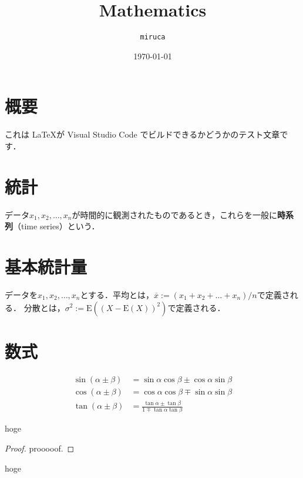 \documentclass[dvipdfmx,uplatex]{jsarticle}
\begin{document}
\title{Mathematics}
\author{\texttt{miruca}}
\date{\today}
\maketitle

\section{概要}
これは \LaTeX が Visual Studio Code でビルドできるかどうかのテスト文章です．

\section{統計}
データ$x_1,x_2,\dots,x_n$が時間的に観測されたものであるとき，これらを一般に\textbf{時系列}（time series）という．

\section{基本統計量}
データを$x_1,x_2,\dots,x_n$とする．平均とは，$\overline{x}:=(x_1 + x_2 + \dots + x_n)/n$で定義される．
分散とは，$\sigma^2:=\mathrm{E}\left( \left( X - \mathrm{E}(X) \right)^2 \right)$で定義される．

\section{数式}
\begin{align}
    \sin(\alpha \pm \beta) &= \sin \alpha \cos \beta \pm \cos \alpha \sin \beta \\
    \cos(\alpha \pm \beta) &= \cos \alpha \cos \beta \mp \sin \alpha \sin \beta \\
    \tan(\alpha \pm \beta) &= \frac{\tan \alpha \pm \tan \beta}{1 \mp \tan \alpha \tan \beta}
\end{align}

\begin{defbox}
    \begin{definition}
      hoge
    \end{definition}
\end{defbox}

\begin{proof}
    prooooof.  
\end{proof}
%
\vspace{\baselineskip}
\begin{theorembox}
    \begin{theorem}
      hoge
    \end{theorem}
\end{theorembox}
\end{document}
